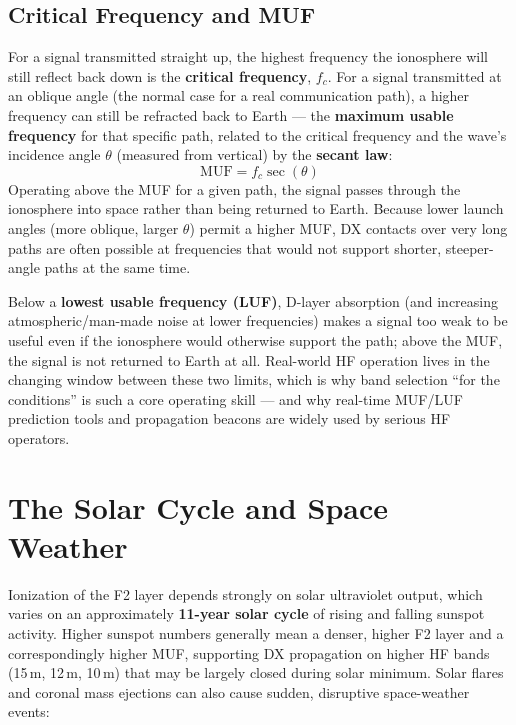 \subsection{Critical Frequency and MUF}

For a signal transmitted straight up, the highest frequency the
ionosphere will still reflect back down is the \textbf{critical
frequency}, $f_c$. For a signal transmitted at an oblique angle
(the normal case for a real communication path), a higher frequency
can still be refracted back to Earth --- the \textbf{maximum usable
frequency} for that specific path, related to the critical frequency and
the wave's incidence angle $\theta$ (measured from vertical) by the
\textbf{secant law}:
\[
\boxed{\text{MUF} = f_c \sec(\theta)}
\]
Operating above the MUF for a given path, the signal passes through the
ionosphere into space rather than being returned to Earth. Because lower
launch angles (more oblique, larger $\theta$) permit a higher MUF, DX
contacts over very long paths are often possible at frequencies that
would not support shorter, steeper-angle paths at the same time.

\begin{keyidea}
Below a \textbf{lowest usable frequency (LUF)}, D-layer absorption (and
increasing atmospheric/man-made noise at lower frequencies) makes a
signal too weak to be useful even if the ionosphere would otherwise
support the path; above the MUF, the signal is not returned to Earth at
all. Real-world HF operation lives in the changing window between these
two limits, which is why band selection ``for the conditions'' is such
a core operating skill --- and why real-time MUF/LUF prediction tools
and propagation beacons are widely used by serious HF operators.
\end{keyidea}

\section{The Solar Cycle and Space Weather}

Ionization of the F2 layer depends strongly on solar ultraviolet
output, which varies on an approximately \textbf{11-year solar cycle} of
rising and falling sunspot activity. Higher sunspot numbers generally
mean a denser, higher F2 layer and a correspondingly higher MUF,
supporting DX propagation on higher HF bands (15\,m, 12\,m, 10\,m) that
may be largely closed during solar minimum. Solar flares and coronal
mass ejections can also cause sudden, disruptive space-weather events:

